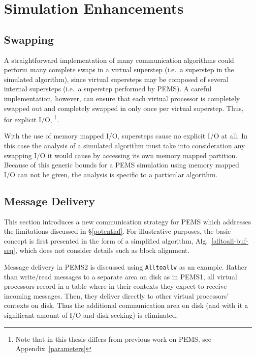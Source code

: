 \documentclass[12pt]{carletoncsthesis}
\begin{document}
\chapter{Simulation Enhancements}
\thispagestyle{empty}
\label{simulation}


\section{Swapping}


A straightforward implementation of many communication algorithms could perform
many complete swaps in a virtual superstep (i.e.\ a superstep in the simulated
algorithm), since virtual supersteps may be composed of several internal
supersteps (i.e.\ a superstep performed by PEMS).  A careful implementation,
however, can ensure that each virtual processor is completely swapped out and
completely swapped in only once per virtual superstep.  Thus, for explicit
I/O, \footnote{Note that  in this thesis differs
from previous work on PEMS, see Appendix~\ref{parameters}}.

With the use of memory mapped I/O, supersteps cause no explicit I/O at all.
In this case the analysis of a simulated algorithm must take into consideration
any swapping I/O it would cause by accessing its own memory mapped partition.
Because of this generic bounds for a PEMS simulation using memory mapped
I/O can not be given, the analysis is specific to a particular algorithm.


\section{Message Delivery}
\label{delivery}


This section introduces a new communication strategy for PEMS which addresses
the limitations discussed in \S\ref{potential}.  For illustrative purposes,
the basic concept is first presented in the form of a simplified algorithm,
Alg.~\ref{alltoall-buf-seq}, which does not consider details such as block
alignment.

Message delivery in PEMS2 is discussed using {\tt Alltoallv} as an example.
Rather than write/read messages to a separate area on disk as in PEMS1,
all virtual processors record in a table where in their contexts they expect
to receive incoming messages.  Then, they deliver directly to other virtual
processors' contexts on disk.  Thus the additional communication area on disk
(and with it a significant amount of I/O and disk seeking) is eliminated.
\end{document}

